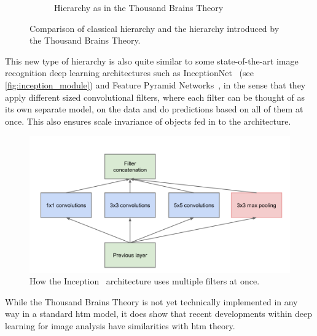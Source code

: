 \begin{figure}[htb]
\begin{subfigure}[t]{0.3\textwidth}
        \caption{Hierarchy as in the Thousand Brains Theory}
        \label{}
    \end{subfigure}
    \caption[Thousand Brains Visualization]{Comparison of classical hierarchy and the hierarchy introduced by the Thousand Brains Theory.}
\end{figure}
\par
This new type of hierarchy is also quite similar to some state-of-the-art image recognition deep learning architectures such as InceptionNet~\cite{inceptionnet} (see \autoref{fig:inception_module}) and Feature Pyramid Networks~\cite{fpn}, in the sense that they apply different sized convolutional filters, where each filter can be thought of as its own separate model, on the data and do predictions based on all of them at once. This also ensures scale invariance of objects fed in to the architecture.
\begin{figure}[htb]
    \centering
    \includegraphics[width=0.7\linewidth]{resources/models/inception_module.png}
    \caption[Filter Concatenation]{How the Inception~\cite{inceptionnet} architecture uses multiple filters at once.}
    \label{fig:inception_module}
\end{figure}
\par
While the Thousand Brains Theory is not yet technically implemented in any way in a standard \gls*{htm} model, it does show that recent developments within deep learning for image analysis have similarities with \gls*{htm} theory.

